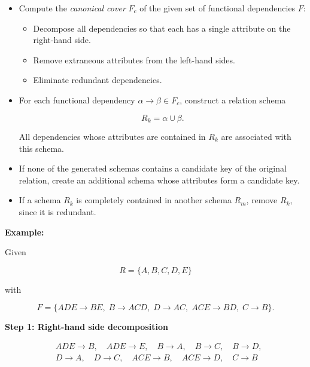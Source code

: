\begin{itemize}

    \item Compute the \emph{canonical cover} \(F_c\) of the given set of functional dependencies \(F\):

    \begin{itemize}

        \item Decompose all dependencies so that each has a single attribute on the right-hand side.

        \item Remove extraneous attributes from the left-hand sides.

        \item Eliminate redundant dependencies.

    \end{itemize}

    \item For each functional dependency \(\alpha \to \beta \in F_c\), construct a relation schema
   
    \[
        R_k = \alpha \cup \beta.
    \]
   
    All dependencies whose attributes are contained in \(R_k\) are associated with this schema.

    \item If none of the generated schemas contains a candidate key of the original relation, create an additional schema whose 
    attributes form a candidate key.

    \item If a schema \(R_k\) is completely contained in another schema \(R_m\), remove \(R_k\), since it is redundant.

\end{itemize}

\textbf{Example:}

Given

\[
    R = \{A, B, C, D, E\}
\]

with

\[
    F = \{ ADE \to BE,\; B \to ACD,\; D \to AC,\; ACE \to BD,\; C \to B \}.
\]

\textbf{Step 1: Right-hand side decomposition}

\begin{align*}
    & ADE \to B,\quad ADE \to E,\quad B \to A,\quad B \to C,\quad B \to D, \\
    & D \to A,\quad D \to C,\quad ACE \to B,\quad ACE \to D,\quad C \to B
\end{align*}

